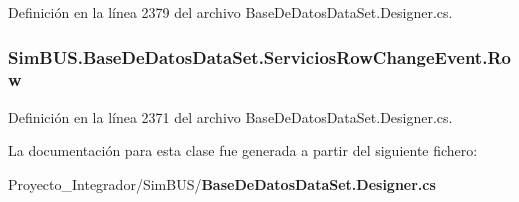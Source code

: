 Definición en la línea 2379 del archivo Base\-De\-Datos\-Data\-Set.\-Designer.\-cs.

\subsubsection[{Row}]{ Sim\-B\-U\-S.\-Base\-De\-Datos\-Data\-Set.\-Servicios\-Row\-Change\-Event.\-Row\hspace{0.3cm}{\ttfamily [get]}}\label{class_sim_b_u_s_1_1_base_de_datos_data_set_1_1_servicios_row_change_event_a9ea3b0699f5b4ecaf7c9a7c907a6540c}


Definición en la línea 2371 del archivo Base\-De\-Datos\-Data\-Set.\-Designer.\-cs.



La documentación para esta clase fue generada a partir del siguiente fichero\-:\begin{DoxyCompactItemize}
\item 
Proyecto\-\_\-\-Integrador/\-Sim\-B\-U\-S/{\bf Base\-De\-Datos\-Data\-Set.\-Designer.\-cs}\end{DoxyCompactItemize}
